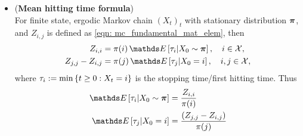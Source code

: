 \documentclass[11pt]{article}
\begin{document}
\begin{itemize}
\item 
\begin{theorem} (\textbf{Mean hitting time formula})\\
For finite state, ergodic Markov chain $(X_t)_t$ with stationary distribution $\boldsymbol{\pi}$, and $Z_{i,j}$ is defined as \eqref{eqn: mc_fundamental_mat_elem}, then 
\begin{align}
Z_{i,i} &= \pi(i)\,\E{}{\tau_i | X_0\sim \mb{\pi}}, \quad i\in \cX, \label{eqn: mc_mean_hitting_time}\\
Z_{j,j} - Z_{i,j} &= \pi(j)\,\E{}{\tau_j | X_0 = i}, \quad i, j \in \cX, \label{eqn: mc_mean_hitting_time_2}
\end{align} where $\tau_i:= \min\left\{t\ge 0: X_{t} = i\right\}$ is the stopping time/first hitting time.
Thus 
\begin{align*}
\E{}{\tau_i | X_0\sim \mb{\pi}} &= \frac{Z_{i,i}}{\pi(i)} \\
\E{}{\tau_j | X_0 = i} &= \frac{\paren{Z_{j,j} - Z_{i,j}}}{\pi(j)}
\end{align*}
\end{theorem}
\end{itemize}
\end{document}
